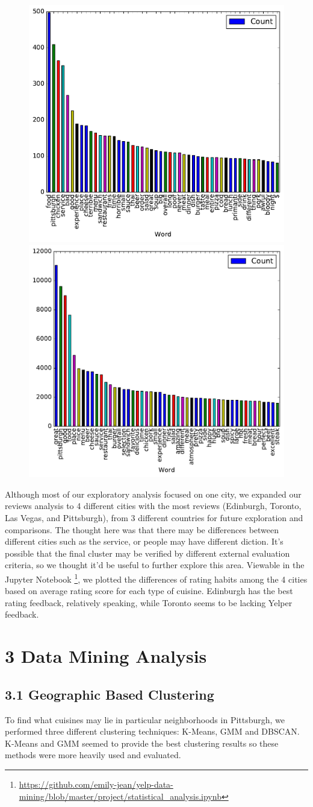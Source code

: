 \documentclass{neu_handout}
\begin{document}
\begin{figure}[h]
\centering
{
\includegraphics[width=0.4\linewidth]{top50_negativereviews}
}
{
\includegraphics[width=0.4\linewidth]{top50_positivereviews}
}
\end{figure}

Although most of our exploratory analysis focused on one city, we expanded our reviews analysis to 4 different cities with the most reviews (Edinburgh, Toronto, Las Vegas, and Pittsburgh), from 3 different countries for future exploration and comparisons. The thought here was that there may be differences between different cities such as the service, or people may have different diction. It's possible that the final cluster may be verified by different external evaluation criteria, so we thought it'd be useful to further explore this area. Viewable in the Jupyter Notebook \footnote{\url{https://github.com/emily-jean/yelp-data-mining/blob/master/project/statistical_analysis.ipynb}}, we plotted the differences of rating habits among the 4 cities based on average rating score for each type of cuisine. Edinburgh has the best rating feedback, relatively speaking, while Toronto seems to be lacking Yelper feedback.


\section*{3 Data Mining Analysis}

\subsection*{3.1 Geographic Based Clustering}
To find what cuisines may lie in particular neighborhoods in Pittsburgh, we performed three different clustering techniques: K-Means, GMM and DBSCAN. K-Means and GMM seemed to provide the best clustering results so these methods were more heavily used and evaluated.
\end{document}
